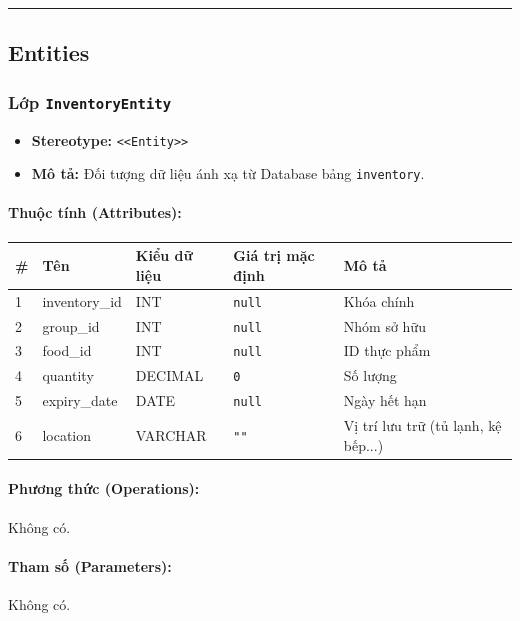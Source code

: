 \documentclass[12pt,a4paper]{article}
\begin{document}
\vskip 0.5cm
\noindent\rule{\textwidth}{0.5pt}
\vskip 0.5cm

\subsection{Entities}


\subsubsection{Lớp \texttt{InventoryEntity}}

\begin{itemize}[leftmargin=*]
    \item \textbf{Stereotype:} \texttt{\textless{}\textless{}Entity\textgreater{}\textgreater{}}
    \item \textbf{Mô tả:} Đối tượng dữ liệu ánh xạ từ Database bảng \texttt{inventory}.
\end{itemize}

\paragraph{Thuộc tính (Attributes):}
\begin{longtable}{|p{0.6cm}|p{3.5cm}|p{2.4cm}|p{1.8cm}|p{5.1cm}|}
\hline
\textbf{\#} & \textbf{Tên} & \textbf{Kiểu dữ liệu} & \textbf{Giá trị mặc định} & \textbf{Mô tả} \\ \hline
\endhead
1 & inventory\_id & INT & \texttt{null} & Khóa chính \\ \hline
2 & group\_id & INT & \texttt{null} & Nhóm sở hữu \\ \hline
3 & food\_id & INT & \texttt{null} & ID thực phẩm \\ \hline
4 & quantity & DECIMAL & \texttt{0} & Số lượng \\ \hline
5 & expiry\_date & DATE & \texttt{null} & Ngày hết hạn \\ \hline
6 & location & VARCHAR & \texttt{""} & Vị trí lưu trữ (tủ lạnh, kệ bếp...) \\ \hline
\end{longtable}

\paragraph{Phương thức (Operations):}
Không có.

\paragraph{Tham số (Parameters):}
Không có.
\end{document}
